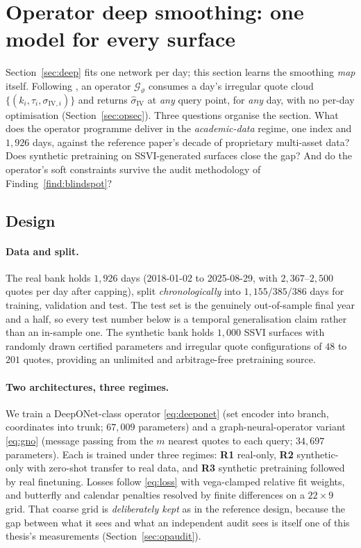 \section{Operator deep smoothing: one model for every surface}\label{sec:operator}

Section~\ref{sec:deep} fits one network per day; this section learns the smoothing \emph{map}
itself. Following \cite{wiedemann2025}, an operator $\mathcal G_\vartheta$ consumes a day's
irregular quote cloud $\{(k_i,\tau_i,\sigma_{\mathrm{IV},i})\}$ and returns
$\widehat\sigma_{\mathrm{IV}}$ at \emph{any} query point, for \emph{any} day, with no per-day
optimisation (Section~\ref{sec:opsec}). Three questions organise the section. What does the
operator programme deliver in the \emph{academic-data} regime, one index and $1{,}926$ days,
against the reference paper's decade of proprietary multi-asset data? Does synthetic
pretraining on SSVI-generated surfaces close the gap? And do the operator's soft constraints
survive the audit methodology of Finding~\ref{find:blindspot}?

\subsection{Design}

\paragraph{Data and split.} The real bank holds $1{,}926$ days (2018-01-02 to 2025-08-29,
with $2{,}367$--$2{,}500$ quotes per day after capping), split \emph{chronologically} into
$1{,}155/385/386$ days for training, validation and test. The test set is the genuinely
out-of-sample final year and a half, so every test number below is a temporal generalisation
claim rather than an in-sample one. The synthetic bank holds $1{,}000$ SSVI surfaces with
randomly drawn certified parameters and irregular quote configurations of $48$ to $201$
quotes, providing an unlimited and arbitrage-free pretraining source.

\paragraph{Two architectures, three regimes.} We train a DeepONet-class operator
\eqref{eq:deeponet} (set encoder into branch, coordinates into trunk; $67{,}009$ parameters)
and a graph-neural-operator variant \eqref{eq:gno} (message passing from the $m$ nearest
quotes to each query; $34{,}697$ parameters). Each is trained under three regimes:
\textbf{R1} real-only, \textbf{R2} synthetic-only with zero-shot transfer to real data, and
\textbf{R3} synthetic pretraining followed by real finetuning. Losses follow \eqref{eq:loss}
with vega-clamped relative fit weights, and butterfly and calendar penalties resolved by
finite differences on a $22\times9$ grid. That coarse grid is \emph{deliberately kept} as in
the reference design, because the gap between what it sees and what an independent audit sees
is itself one of this thesis's measurements (Section~\ref{sec:opaudit}).

